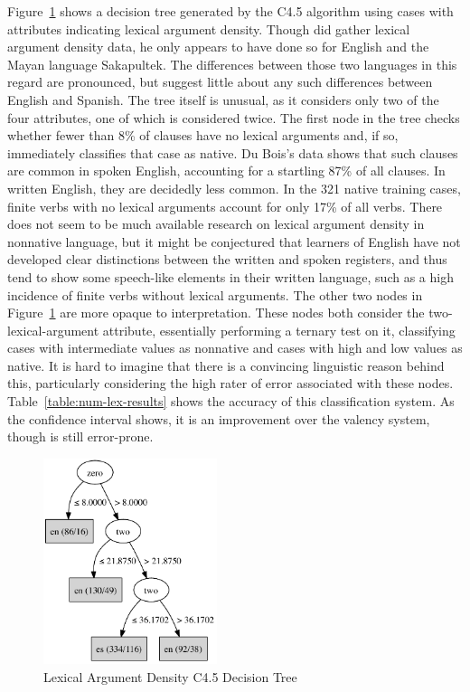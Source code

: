 \documentclass[main.tex]{subfiles}
\begin{document}
Figure~\ref{fig:c4.5-num-lex} shows a decision tree generated by the C4.5 algorithm using cases with attributes indicating lexical argument density. Though \citet{dubois:2003} did gather lexical argument density data, he only appears to have done so for English and the Mayan language Sakapultek. The differences between those two languages in this regard are pronounced, but suggest little about any such differences between English and Spanish. The tree itself is unusual, as it considers only two of the four attributes, one of which is considered twice. The first node in the tree checks whether fewer than 8\% of clauses have no lexical arguments and, if so, immediately classifies that case as native. Du Bois's data shows that such clauses are common in spoken English, accounting for a startling 87\% of all clauses. In written English, they are decidedly less common. In the 321 native training cases, finite verbs with no lexical arguments account for only 17\% of all verbs. There does not seem to be much available research on lexical argument density in nonnative language, but it might be conjectured that learners of English have not developed clear distinctions between the written and spoken registers, and thus tend to show some speech-like elements in their written language, such as a high incidence of finite verbs without lexical arguments. The other two nodes in Figure~\ref{fig:c4.5-num-lex} are more opaque to interpretation. These nodes both consider the two-lexical-argument attribute, essentially performing a ternary test on it, classifying cases with intermediate values as nonnative and cases with high and low values as native. It is hard to imagine that there is a convincing linguistic reason behind this, particularly considering the high rater of error associated with these nodes. Table~\ref{table:num-lex-results} shows the accuracy of this classification system. As the confidence interval shows, it is an improvement over the valency system, though is still error-prone.

\begin{figure}[ht]
\centering
\includegraphics[width=2in]{c45-num-lex.pdf}
\caption{Lexical Argument Density C4.5 Decision Tree}
\label{fig:c4.5-num-lex}
\end{figure}
\end{document}
